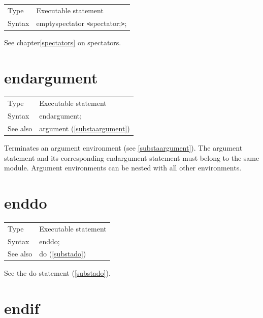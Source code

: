 \noindent \begin{tabular}{ll}
Type & Executable statement\\
Syntax & emptyspectator {\tt<}spectator;{\tt>};
\end{tabular} \vspace{4mm}

\noindent See chapter\ref{spectators} on spectators.
\vspace{10mm}


\section{endargument}
\label{substaendargument}

\noindent \begin{tabular}{ll}
Type & Executable statement\\
Syntax & endargument; \\
See also & argument (\ref{substaargument})
\end{tabular} \vspace{4mm}

\noindent Terminates an argument environment 
(see \ref{substaargument}). The argument statement and its 
corresponding endargument statement must belong to the 
same module. Argument environments can be nested with all other 
environments. \vspace{10mm}


\section{enddo}
\label{substaenddo}

\noindent \begin{tabular}{ll}
Type & Executable statement\\
Syntax & enddo;
\\ See also & do (\ref{substado})
\end{tabular} \vspace{4mm}

See the do statement (\ref{substado}).
\vspace{10mm}


\section{endif}
\label{substaendif}

